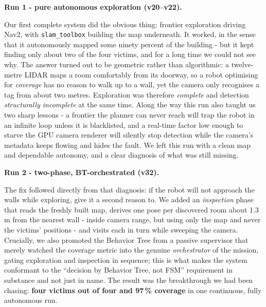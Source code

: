 \documentclass[11pt,a4paper]{article}
\newcommand{\head}[1]{\par\smallskip\noindent\textbf{\color{nccblue}#1}\par}
\begin{document}
\head{Run 1 - pure autonomous exploration (v20--v22).} Our first complete system did the obvious thing:
frontier exploration driving Nav2, with \texttt{slam\_toolbox} building the map underneath. It worked, in
the sense that it autonomously mapped some ninety percent of the building - but it kept finding only
about two of the four victims, and for a long time we could not see why. The answer turned out to be
geometric rather than algorithmic: a twelve-metre LIDAR maps a room comfortably from its doorway, so a
robot optimising for \emph{coverage} has no reason to walk up to a wall, yet the camera only recognises a
tag from about two metres. Exploration was therefore \emph{complete} and detection \emph{structurally
incomplete} at the same time. Along the way this run also taught us two sharp lessons - a frontier the
planner can never reach will trap the robot in an infinite loop unless it is blacklisted, and a
real-time factor low enough to starve the GPU camera renderer will silently stop detection while the
camera's metadata keeps flowing and hides the fault. We left this run with a clean map and dependable
autonomy, and a clear diagnosis of what was still missing.

\head{Run 2 - two-phase, BT-orchestrated (v32).} The fix followed directly from that diagnosis: if the
robot will not approach the walls while exploring, give it a second reason to. We added an
\emph{inspection} phase that reads the freshly built map, derives one pose per discovered room about
1.3\,m from the nearest wall - inside camera range, but using only the map and never the victims'
positions - and visits each in turn while sweeping the camera. Crucially, we also promoted the Behavior
Tree from a passive supervisor that merely watched the coverage metric into the genuine \emph{orchestrator}
of the mission, gating exploration and inspection in sequence; this is what makes the system conformant
to the ``decision by Behavior Tree, not FSM'' requirement in substance and not just in name. The result
was the breakthrough we had been chasing: \textbf{four victims out of four and 97\,\% coverage} in one
continuous, fully autonomous run.
\end{document}
